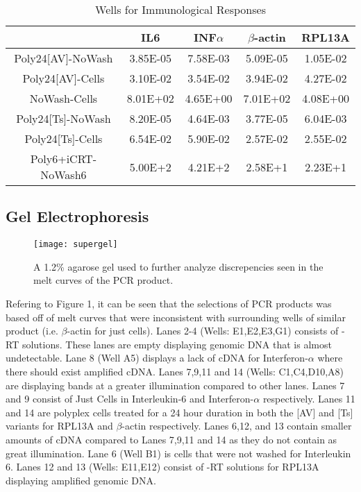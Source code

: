 \documentclass[journal, a4paper]{IEEEtran}
\begin{document}
    \begin{table}[!hbt]
      \begin{center}
      \caption{Wells for Immunological Responses}
      \label{tab:simParameters}
      \begin{tabular}{|c|c|c|c|c|}
        \hline
        & IL6 & INF$\alpha$ & $\beta$-actin & RPL13A \\
        \hline
        Poly24[AV]-NoWash & 3.85E-05 & 7.58E-03 & 5.09E-05 & 1.05E-02 \\
        \hline
        Poly24[AV]-Cells & 3.10E-02 & 3.54E-02 & 3.94E-02 & 4.27E-02 \\
        \hline
        NoWash-Cells & 8.01E+02 & 4.65E+00 & 7.01E+02 & 4.08E+00 \\
        \hline
        Poly24[Ts]-NoWash & 8.20E-05 & 4.64E-03 & 3.77E-05 & 6.04E-03\\
        \hline
        Poly24[Ts]-Cells & 6.54E-02 & 5.90E-02 & 2.57E-02 & 2.55E-02\\
        \hline
        Poly6+iCRT-NoWash6 & 5.00E+2 & 4.21E+2 & 2.58E+1 & 2.23E+1 \\
        \hline
      \end{tabular}
      \end{center}
    \end{table}

  \subsection{Gel Electrophoresis}

    \begin{figure}[t]
      \centering
      \texttt{[image: supergel]}
      \caption{A 1.2\% agarose gel used to further analyze discrepencies seen in the melt curves of the PCR product.}
      \label{fig:mesh1}
    \end{figure}

    Refering to Figure 1, it can be seen that the selections of PCR products was based off of melt curves that were inconsistent with
    surrounding wells of similar product (i.e. $\beta$-actin for just cells).
    Lanes 2-4 (Wells: E1,E2,E3,G1) consists of -RT solutions. These lanes are empty displaying
    genomic DNA that is almost undetectable. Lane 8 (Well A5) displays a lack of cDNA
    for Interferon-$\alpha$ where there should exist amplified cDNA. Lanes  7,9,11 and 14
    (Wells: C1,C4,D10,A8) are displaying bands at a greater illumination compared to other lanes.
    Lanes 7 and 9 consist of Just Cells in Interleukin-6 and Interferon-$\alpha$ respectively.
    Lanes 11 and 14 are polyplex cells treated for a 24 hour duration in both the [AV] and [Ts] variants
    for RPL13A and $\beta$-actin respectively.
    Lanes 6,12, and 13 contain smaller amounts of cDNA compared to Lanes 7,9,11 and 14 as they do not contain
    as great illumination.
    Lane 6 (Well B1) is cells that were not washed for Interleukin 6.
    Lanes 12 and 13 (Wells: E11,E12) consist of -RT solutions for RPL13A displaying amplified genomic DNA.
\end{document}
